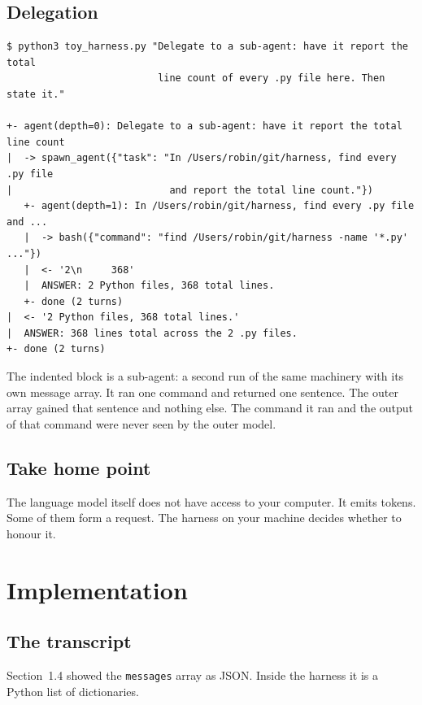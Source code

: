 \documentclass[11pt]{article}
\newenvironment{keep}{\par\addvspace{0.5\baselineskip}\noindent\begin{minipage}{\linewidth}}{\end{minipage}}
\newcommand{\code}[1]{\texttt{#1}}
\begin{document}
\subsection{Delegation}

\begin{keep}
\begin{lstlisting}
$ python3 toy_harness.py "Delegate to a sub-agent: have it report the total
                          line count of every .py file here. Then state it."

+- agent(depth=0): Delegate to a sub-agent: have it report the total line count
|  -> spawn_agent({"task": "In /Users/robin/git/harness, find every .py file
|                           and report the total line count."})
   +- agent(depth=1): In /Users/robin/git/harness, find every .py file and ...
   |  -> bash({"command": "find /Users/robin/git/harness -name '*.py' ..."})
   |  <- '2\n     368'
   |  ANSWER: 2 Python files, 368 total lines.
   +- done (2 turns)
|  <- '2 Python files, 368 total lines.'
|  ANSWER: 368 lines total across the 2 .py files.
+- done (2 turns)
\end{lstlisting}
\end{keep}

The indented block is a sub-agent: a second run of the same machinery with its
own message array. It ran one command and returned one sentence. The outer array
gained that sentence and nothing else. The command it ran and the output of that
command were never seen by the outer model.

\subsection{Take home point}

The language model itself does not have access to your computer. It emits tokens.
Some of them form a request. The harness on your machine decides whether to
honour it.

\section{Implementation}

\subsection{The transcript}

Section~1.4 showed the \code{messages} array as JSON. Inside the harness it is a
Python list of dictionaries.
\end{document}
